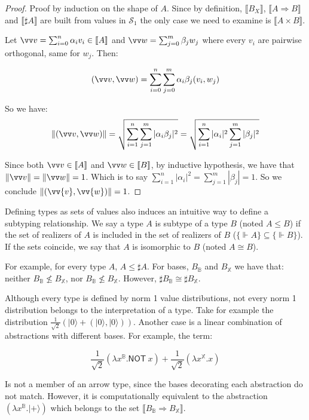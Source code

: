 \documentclass[runningheads,orivec,envcountsame,envcountsect]{llncs}
\newcommand\ket[1]{\ensuremath{|#1\rangle}}
\def\Sph{\mathcal{S}_1}       %
\def\Pair#1#2{(#1,#2)} %
\def\Lam#1#2#3{\lambda#1^{#2}{.}#3} %
\def\Arr{\Rightarrow}
\def\sem#1{\llbracket#1\rrbracket}
\def\real{\Vdash}
\newcommand\B{\mathbb B}
\newcommand\XB{\mathbb X}
\newcommand{\pauliX}[1]{\mathsf{NOT}\ #1}
\newcommand\basis[1]{\ensuremath{B_{ #1 }}}
\begin{document}
\begin{proof}
  Proof by induction on the shape of $A$. Since by definition, $\sem{\basis{X}}$, $\sem{A\Arr B}$ and $\sem{\sharp{A}}$ are built from values in $\Sph$ the only case we need to examine is $\sem{A\times B}$.
  
  Let $\vv v = \sum_{i=0}^{n} \alpha_i v_i \in\sem{A}$ and $\vv w = \sum_{j=0}^{m} \beta_j w_j$ where every $v_i$ are pairwise orthogonal, same for $w_j$. Then:
     
  \[(\vv v, \vv w) = \sum_{i=0}^{n} \sum_{j=0}^{m} \alpha_i\beta_j (v_i,w_j)\]
  
  So we have: 
  \[\|\Pair{\vv v}{\vv w}\| = \sqrt{\sum_{i=1}^n\sum_{j=1}^{m} |\alpha_i\beta_j|^2} = \sqrt{\sum_{i=1}^n |\alpha_i|^2 \sum_{j=1}^{m} |\beta_j|^2}\]

  Since both $\vv v\in\sem{A}$ and $\vv w\in\sem{B}$, by inductive hypothesis, we have that $\|\vv v\| = \| \vv w \| = 1$. Which is to say $\sum_{i=1}^{n} |\alpha_i|^2 = \sum_{j=1}^{m} |\beta_j| = 1$. So we conclude $\|\Pair{\vv{v}}{\vv{w}}\| = 1$.
  
\end{proof}

Defining types as sets of values also induces an intuitive way to define a subtyping relationship. We say a type $A$ is subtype of a type $B$ (noted $A\leq B$) if the set of realizers of $A$ is included in the set of realizers of $B$ ($\{\real A\}\subseteq\{\real B\}$). If the sets coincide, we say that $A$ is isomorphic to $B$ (noted $A\cong B$). 

\begin{example}
  For example, for every type $A$, $A\leq\sharp A$. For bases, $\basis{\B}$ and $\basis{\XB}$ we have that: neither $\basis{\B}\not\leq\basis{\XB}$, nor $\basis{\B}\not\leq\basis{\XB}$. However, $\sharp\basis{\B}\cong\sharp\basis{\XB}$.
\end{example}

Although every type is defined by norm 1 value distributions, not every norm 1 distribution belongs to the interpretation of a type. Take for example the distribution $\frac{1}{\sqrt{2}} (\ket{0} + \Pair{\ket{0}}{\ket 0})$. Another case is a linear combination of abstractions with different bases. For example, the term:

\[
\frac{1}{\sqrt{2}}(\Lam{x}{\B}{\pauliX{x}}) + \frac{1}{\sqrt{2}}(\Lam{x}{\XB}{x})
\]

Is not a member of an arrow type, since the bases decorating each abstraction do not match. However, it is computationally equivalent to the abstraction $(\Lam{x}{\B}{\ket{+}})$ which belongs to the set $\sem{\basis{\B}\Arr\basis{\XB}}$.
\end{document}
